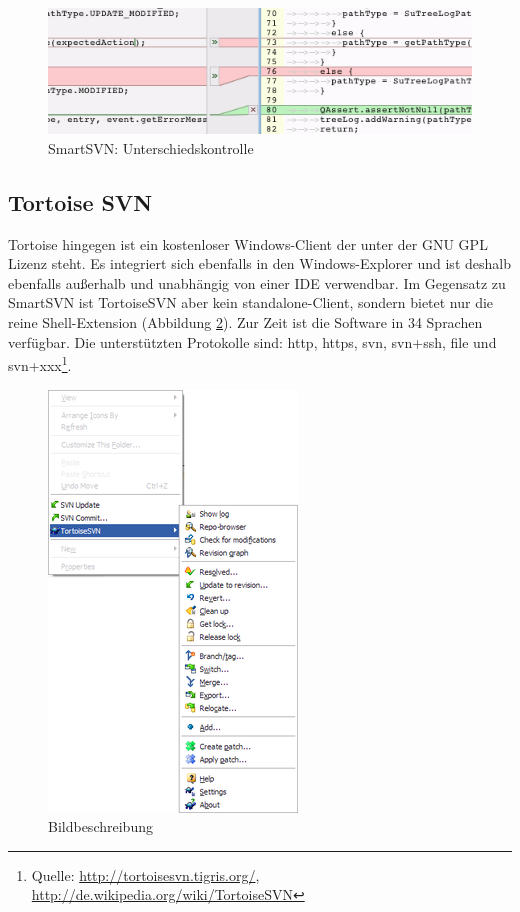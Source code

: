 \begin{figure}[!htb]
        \centering
        \includegraphics[width=.9\textwidth]{3_smartsvn3.png}
        \caption{SmartSVN: Unterschiedskontrolle}
        \label{fig:smart3}
\end{figure}
\subsection{Tortoise SVN}
Tortoise hingegen ist ein kostenloser Windows-Client der unter der GNU GPL Lizenz steht. Es integriert sich ebenfalls in den Windows-Explorer und ist deshalb ebenfalls außerhalb und unabhängig von einer IDE verwendbar. Im Gegensatz zu SmartSVN ist TortoiseSVN aber kein standalone-Client, sondern bietet nur die reine Shell-Extension (Abbildung \ref{fig:tortoise1}).
Zur Zeit ist die Software in 34 Sprachen verfügbar.
Die unterstützten Protokolle sind: http, https, svn, svn+ssh, file und svn+xxx\footnote{Quelle: \url{http://tortoisesvn.tigris.org/}, \url{http://de.wikipedia.org/wiki/TortoiseSVN}}.
\begin{figure}[!htb]
	\centering
	\includegraphics[width=.45\textwidth]{4_turtoise1.png}
	\caption{Bildbeschreibung}
	\label{fig:tortoise1}
\end{figure}  
